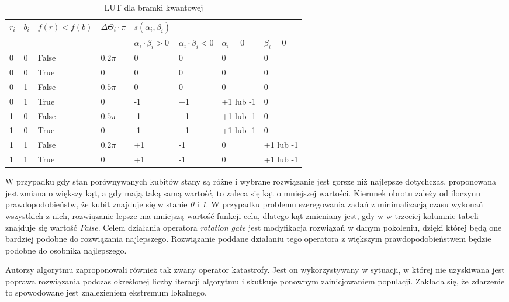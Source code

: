 \begin{table}[h]
\label{LUT_TAB}
\begin{tabular}{l l l l l l l l}
\hline
$r_i$ & $b_i$ & $f(r)<f(b)$ & $\Delta\Theta_i \cdot \pi$ & $s(\alpha_i,\beta_i)$ & & & \\
\cline{5-8} 
& & & & $\alpha_i \cdot \beta_i > 0$ & $\alpha_i \cdot \beta_i < 0$ & $\alpha_i = 0$ & $\beta_i = 0$ \\
\hline
0 & 0 & False & $0.2\pi$ & 0 & 0 & 0 & 0\\
0 & 0 & True  & 0        & 0 & 0 & 0 & 0\\
0 & 1 & False & $0.5\pi$ & 0 & 0 & 0 & 0\\
0 & 1 & True  & 0        & -1 & +1 & +1 lub -1 & 0\\
1 & 0 & False & $0.5\pi$ & -1 & +1 & +1 lub -1 & 0\\
1 & 0 & True  & 0        & -1 & +1 & +1 lub -1 & 0\\
1 & 1 & False & $0.2\pi$ & +1 & -1 & 0 & +1 lub -1\\
1 & 1 & True  & 0        & +1 & -1 & 0 & +1 lub -1\\
\hline
\end{tabular}
\caption{LUT dla bramki kwantowej}
\end{table}

W przypadku gdy stan porównywanych kubitów stany są różne i wybrane rozwiązanie jest gorsze niż najlepsze dotychczas, proponowana jest zmiana o większy kąt, a gdy mają taką samą wartość, to zaleca się kąt o mniejszej wartości. Kierunek obrotu zależy od iloczynu prawdopodobieństw, że kubit znajduje się w stanie \textit{0} i \textit{1}. W przypadku problemu szeregowania zadań z minimalizacją czasu wykonań wszystkich z nich, rozwiązanie lepsze ma mniejszą wartość funkcji celu, dlatego kąt zmieniany jest, gdy w w trzeciej kolumnie tabeli znajduje się wartość \textit{False}. Celem działania operatora \textit{rotation gate} jest  modyfikacja rozwiązań w danym pokoleniu, dzięki której będą one bardziej podobne do rozwiązania najlepszego. Rozwiązanie poddane działaniu tego operatora z większym prawdopodobieństwem będzie podobne do osobnika najlepszego.

Autorzy algorytmu zaproponowali również tak zwany operator katastrofy. Jest on wykorzystywany w sytuacji, w której nie uzyskiwana jest poprawa rozwiązania podczas określonej liczby iteracji algorytmu i skutkuje ponownym zainicjowaniem populacji. Zakłada się, że zdarzenie to spowodowane jest znalezieniem ekstremum lokalnego.

